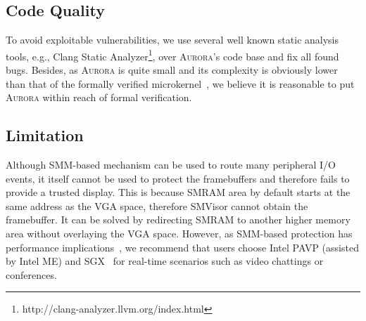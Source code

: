 \subsection{Code Quality}
To avoid exploitable vulnerabilities, we use several well known static analysis tools, e.g., Clang Static Analyzer\footnote{http://clang-analyzer.llvm.org/index.html}, over \textsc{Aurora}'s code base and fix all found bugs. Besides, as \textsc{Aurora} is quite small and its complexity is obviously lower than that of the formally verified microkernel~\cite{DBLP:conf/sosp/KleinEHACDEEKNSTW09}, we believe it is reasonable to put \textsc{Aurora} within reach of formal verification.

%

\subsection{Limitation}
Although SMM-based mechanism can be used to route many peripheral I/O events, it itself cannot be used to protect the framebuffers and therefore fails to provide a trusted display. This is because SMRAM area by default starts at the same address as the VGA space, therefore SMVisor cannot obtain the framebuffer. It can be solved by redirecting  SMRAM to another higher memory area without overlaying the VGA space. However, as SMM-based protection has performance implications~\cite{DBLP:conf/iiswc/DelgadoK13}, we recommend that users choose Intel PAVP (assisted by Intel ME) and SGX~\cite{DBLP:conf/isca/HoekstraLPPC13} for real-time scenarios such as video chattings or conferences.



